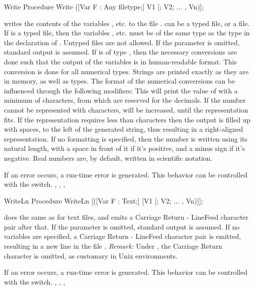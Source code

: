 \documentclass{report}
\begin{document}
\html{}
\begin{procedure}{Write}
\Declaration
Procedure Write ([Var F : Any filetype;] V1 [; V2; ... , Vn)];

\Description
{} writes the contents of the variables ,  etc. to
the file .  can be a typed file, or a  file.
If  is a typed file, then the variables ,  etc. must
be of the same type as the type in the declaration of . Untyped files
are not allowed.
If the parameter  is omitted, standard output is assumed.
If  is of type , then the necessary conversions are done
such that the output of the variables is in human-readable format.
This conversion is done for all numerical types. Strings are printed exactly
as they are in memory, as well as  types.
The format of the numerical conversions can be influenced through
the following modifiers:
This will print the value of  with a minimum of
 characters, from which  are reserved for the
decimals. If the number cannot be represented with  characters,
 will be increased, until the representation fits. If the
representation requires less than  characters then the output
is filled up with spaces, to the left of the generated string, thus
resulting in a right-aligned representation.
If no formatting is specified, then the number is written using its natural
length, with a space in front of it if it's positive, and a minus sign if
it's negative.
Real numbers are, by default, written in scientific notation.

\Errors
If an error occurs, a run-time error is generated. This behavior can be
controlled with the  switch.
\SeeAlso
{}, , , 
\end{procedure}
\begin{procedure}{WriteLn}
\Declaration
Procedure WriteLn [([Var F : Text;] [V1 [; V2; ... , Vn)]];

\Description
{} does the same as  for text files, and emits a
Carriage Return - LineFeed character pair after that.
If the parameter  is omitted, standard output is assumed.
If no variables are specified, a Carriage Return - LineFeed character pair
is emitted, resulting in a new line in the file .
{\em Remark:} Under \linux, the Carriage Return character is omitted, as
customary in Unix environments.

\Errors
If an error occurs, a run-time error is generated. This behavior can be
controlled with the  switch.
\SeeAlso
{}, , , 
\end{procedure}
\html{}
%
%
\printindex
\end{document}
